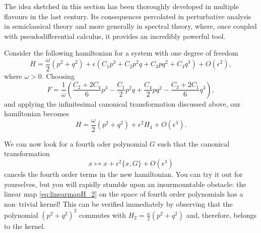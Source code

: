\documentclass[english,fontsize=11pt,paper=a5,oneside]{scrbook}
\theoremstyle{definition}
\newenvironment{example}
  {\pushQED{\qed}\renewcommand{\qedsymbol}{$\lozenge$}\examplex}
  {\popQED\endexamplex}
\begin{document}
The idea sketched in this section has been thoroughly developed in multiple flavours in the last century.
Its consequences percolated in perturbative analysis in semiclassical theory and more generally in spectral theory, where, once coupled with pseudodifferential calculus, it provides an incredibly powerful tool.

\begin{example}
    Consider the following hamiltonian for a system with one degree of freedom
    \begin{equation}
        H = \frac\omega2 (p^2 + q^2) + \epsilon(C_1 p^3 + C_2 p^2 q + C_3 p q^2 + C_4 q^3) + O(\epsilon^2),
    \end{equation}
    where $\omega >0$.
    Choosing
    \begin{equation}
        F = \frac{1}{\omega}\left(
            \frac{C_2 + 2 C_4}{6} p^3
            - \frac {C_1}2 p^2 q
            + \frac{C_4}{2} p q^2
            -\frac{C_3 + 2 C_1}{6} q^3
        \right),
    \end{equation}
    and applying the infinitesimal canonical transformation discussed above, our hamiltonian becomes
    \begin{equation}
        H = \frac{\omega}{2}(p^2 + q^2) + \epsilon^2 H_4 + O(\epsilon^3).
    \end{equation}

    We can now look for a fourth oder polynomial $G$ such that the canonical transformation
    \begin{equation}
        x \mapsto x + \epsilon^2 \big\{x, G\big\} + O(\epsilon^3)
    \end{equation}
    cancels the fourth order terms in the new hamiltonian.
    You can try it out for yourselves, but you will rapidly stumble upon an insurmountable obstacle: the linear map \eqref{eq:linearmapH_2} on the space of fourth order polynomials has a non--trivial kernel! This can be verified immediately by observing that the polynomial $(p^2+q^2)^2$ commutes with $H_2=\frac\omega2(p^2+q^2)$ and, therefore, belongs to the kernel.
\end{example}
\end{document}
